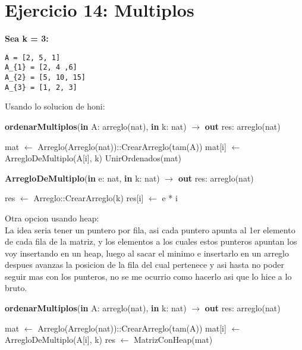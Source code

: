 \section{Ejercicio 14: Multiplos}
\textbf{Sea k = 3:}
\begin{lstlisting}
A = [2, 5, 1]
A_{1} = [2, 4 ,6]
A_{2} = [5, 10, 15]
A_{3} = [1, 2, 3]
\end{lstlisting}
Usando lo solucion de honi:
\begin{algorithm}[H]
\caption{
    \textbf{ordenarMultiplos}(\textbf{in} A: arreglo(nat), \textbf{in} k: nat) $\to$ \textbf{out} res: arreglo(nat)
}
    \begin{algorithmic}[1]
        \State mat $\gets$ Arreglo(Arreglo(nat))::CrearArreglo(tam(A))
         
            \State mat[i] $\gets$ ArregloDeMultiplo(A[i], k) 
        \EndFor
        \State UnirOrdenados(mat) 
    \end{algorithmic}
\end{algorithm}

\begin{algorithm}[H]
\caption{
    \textbf{ArregloDeMultiplo}(\textbf{in} e: nat, \textbf{in} k: nat) $\to$ \textbf{out} res: arreglo(nat)
}
    \begin{algorithmic}[1]
        \State res $\gets$ Arreglo::CrearArreglo(k)
            \State res[i] $\gets$ e * i
        \EndFor
    \end{algorithmic}
\end{algorithm}

Otra opcion usando heap:\\
La idea seria tener un puntero por fila, asi cada puntero apunta al 1er elemento de cada fila de la matriz, y los elementos a los cuales estos punteros apuntan los voy insertando en un heap, luego al sacar el minimo e insertarlo en un arreglo despues avanzas la posicion de la fila del cual pertenece y asi hasta no poder seguir mas con los punteros, no se me ocurrio como hacerlo asi que lo hice a lo bruto.
\begin{algorithm}[H]
\caption{
    \textbf{ordenarMultiplos}(\textbf{in} A: arreglo(nat), \textbf{in} k: nat) $\to$ \textbf{out} res: arreglo(nat)
}
    \begin{algorithmic}[1]
        \State mat $\gets$ Arreglo(Arreglo(nat))::CrearArreglo(tam(A))
         
            \State mat[i] $\gets$ ArregloDeMultiplo(A[i], k) 
        \EndFor
        \State res $\gets$ MatrizConHeap(mat) 
    \end{algorithmic}
\end{algorithm}

